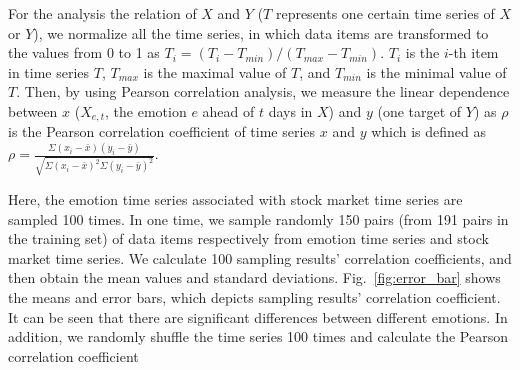 \documentclass[aps,preprint,groupedaddress]{revtex4-1}
\begin{document}
For the analysis the relation of $X$ and $Y$ ($T$ represents one certain time series of $X$ or $Y$), we normalize all the time series, in which data items are transformed to the values from 0 to 1 as $T_{i}=(T_{i} - T_{min})/(T_{max} - T_{min})$. $T_{i}$ is the $i$-th item in time series $T$, $T_{max}$ is the maximal value of $T$, and $T_{min}$ is the minimal value of $T$. Then, by using Pearson correlation analysis, we measure the linear dependence between $x$ ($X_{e, t}$, the emotion $e$ ahead of $t$ days in $X$) and $y$ (one target of $Y$) as $\rho$ is the Pearson correlation coefficient of time series $x$ and $y$ which is defined as $\rho = \frac{\Sigma(x_{i} - \bar{x})(y_{i} - \bar{y})}{\sqrt{\Sigma(x_i - \bar{x})^2\Sigma(y_i - \bar{y})^2}}.$

{} Here, the emotion time series associated with stock market time series are sampled 100 times. In one time, we sample randomly 150 pairs (from 191 pairs in the training set) of data items respectively from emotion time series and stock market time series. We calculate 100 sampling results' correlation coefficients, and then obtain the mean values and standard deviations. Fig.~\ref{fig:error_bar} shows the means and error bars, which depicts sampling results' correlation coefficient. It can be seen that there are significant differences between different emotions. In addition, we randomly shuffle the time series 100 times and calculate the Pearson correlation coefficient {}
\end{document}
